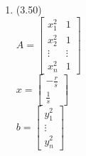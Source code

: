 \documentclass[letterpaper,12pt]{article}
\theoremstyle{definition}
\begin{document}
\begin{enumerate}
	\item(3.50)\\
	$A=
	\begin{bmatrix}
	    x_{1}^{2} & 1  \\
	   x_{2}^{2} & 1\\
	    \vdots & \vdots  \\
	   x_{n}^{2} & 1 
	\end{bmatrix}
	$\\
	$x = 
	\begin{bmatrix}
	    -\frac{r}{s}  \\
	   \frac{1}{s}
	\end{bmatrix}
	$\\
	$
	b= 
	\begin{bmatrix}
	    y_{1}^{2}  \\
	   \vdots \\
	    y_{n}^{2}
	\end{bmatrix}
	$
	
	 
 	




\end{enumerate}

\vspace{25mm}
\end{document}
